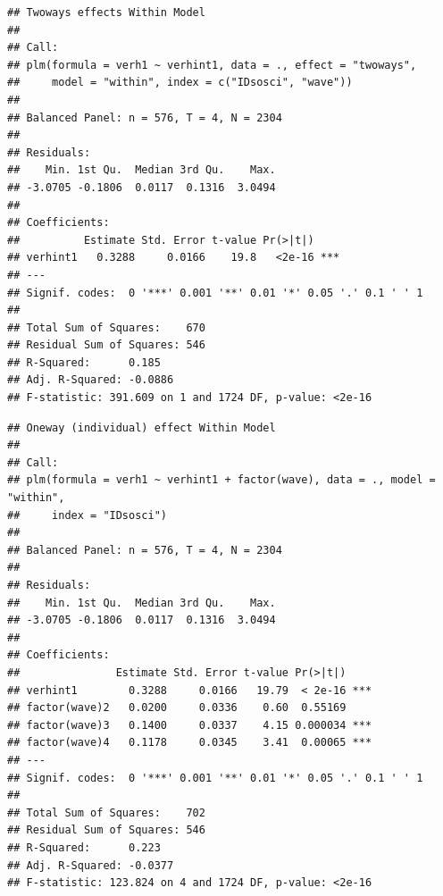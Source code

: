 \documentclass[
]{book}
\newenvironment{Shaded}{\begin{snugshade}}{\end{snugshade}}
\newcommand{\DataTypeTok}[1]{\textcolor[rgb]{0.13,0.29,0.53}{#1}}
\newcommand{\KeywordTok}[1]{\textcolor[rgb]{0.13,0.29,0.53}{\textbf{#1}}}
\newcommand{\NormalTok}[1]{#1}
\newcommand{\OperatorTok}[1]{\textcolor[rgb]{0.81,0.36,0.00}{\textbf{#1}}}
\newcommand{\StringTok}[1]{\textcolor[rgb]{0.31,0.60,0.02}{#1}}
\begin{document}
\begin{verbatim}
## Twoways effects Within Model
## 
## Call:
## plm(formula = verh1 ~ verhint1, data = ., effect = "twoways", 
##     model = "within", index = c("IDsosci", "wave"))
## 
## Balanced Panel: n = 576, T = 4, N = 2304
## 
## Residuals:
##    Min. 1st Qu.  Median 3rd Qu.    Max. 
## -3.0705 -0.1806  0.0117  0.1316  3.0494 
## 
## Coefficients:
##          Estimate Std. Error t-value Pr(>|t|)    
## verhint1   0.3288     0.0166    19.8   <2e-16 ***
## ---
## Signif. codes:  0 '***' 0.001 '**' 0.01 '*' 0.05 '.' 0.1 ' ' 1
## 
## Total Sum of Squares:    670
## Residual Sum of Squares: 546
## R-Squared:      0.185
## Adj. R-Squared: -0.0886
## F-statistic: 391.609 on 1 and 1724 DF, p-value: <2e-16
\end{verbatim}

\begin{Shaded}
\end{Shaded}

\begin{verbatim}
## Oneway (individual) effect Within Model
## 
## Call:
## plm(formula = verh1 ~ verhint1 + factor(wave), data = ., model = "within", 
##     index = "IDsosci")
## 
## Balanced Panel: n = 576, T = 4, N = 2304
## 
## Residuals:
##    Min. 1st Qu.  Median 3rd Qu.    Max. 
## -3.0705 -0.1806  0.0117  0.1316  3.0494 
## 
## Coefficients:
##               Estimate Std. Error t-value Pr(>|t|)    
## verhint1        0.3288     0.0166   19.79  < 2e-16 ***
## factor(wave)2   0.0200     0.0336    0.60  0.55169    
## factor(wave)3   0.1400     0.0337    4.15 0.000034 ***
## factor(wave)4   0.1178     0.0345    3.41  0.00065 ***
## ---
## Signif. codes:  0 '***' 0.001 '**' 0.01 '*' 0.05 '.' 0.1 ' ' 1
## 
## Total Sum of Squares:    702
## Residual Sum of Squares: 546
## R-Squared:      0.223
## Adj. R-Squared: -0.0377
## F-statistic: 123.824 on 4 and 1724 DF, p-value: <2e-16
\end{verbatim}
\end{document}
